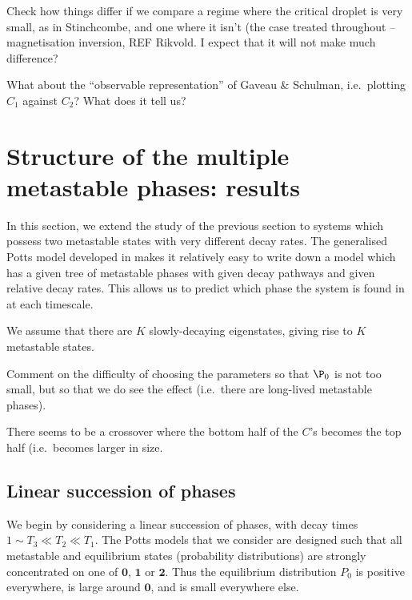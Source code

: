 \documentclass[10pt]{article}
\newcommand{\zeros}{\mathbf{0}}
\newcommand{\ones}{\mathbf{1}}
\newcommand{\twos}{\mathbf{2}}
\newcommand{\comment}[1]{{\color{red}#1}}
\begin{document}
\comment{Check how things differ if we compare a regime where the critical droplet is
very small, as in Stinchcombe, and one where it isn't (the case treated throughout -- magnetisation inversion, REF Rikvold.
I expect that it will not make much difference?
}


What
about the
``observable representation'' of Gaveau \& Schulman, i.e.\ plotting $C_1$
against $C_2$? What does it tell us?



\section{Structure of the multiple metastable phases: results}
In this section, we extend the study of the previous section to systems which possess 
two metastable states with very different decay rates. The generalised
Potts model developed in
\cite{SandersLarraldeLeyvrazCompetitiveNucleationPottsPRB2007} makes it
relatively easy to write down a model which has a given tree of metastable
phases with given decay pathways and given relative decay rates.  This allows
us to predict which phase the system is found in at each timescale.

We assume that there are $K$ slowly-decaying eigenstates, giving rise to $K$
metastable states.

\comment{Comment on the difficulty of choosing the parameters so that $\P_0$ is not too small, 
but so that we do see the effect (i.e.\ there are long-lived metastable phases).

There seems to be a crossover where the bottom half of the $C$'s becomes the top half (i.e.\ becomes
larger in size.
}

\subsection{Linear succession of phases}
We begin by considering a linear succession of phases, with decay times
 $1 \sim T_3 \ll T_2 \ll T_1$.
 The Potts models that we consider are designed such that 
all metastable and equilibrium states (probability distributions) are strongly
concentrated on one of
$\zeros$, $\ones$ or $\twos$.
Thus the equilibrium distribution $P_0$ is positive everywhere, is
large around $\zeros$, and is small everywhere else.
\end{document}
